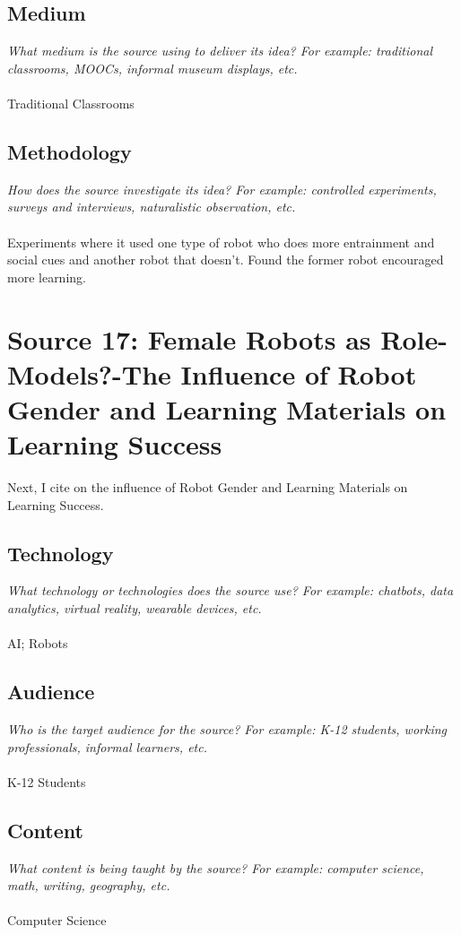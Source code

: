 \documentclass[12pt, final]{article}
\begin{document}
\subsection{Medium}
\textit{What medium is the source using to deliver its idea? For example: traditional classrooms, MOOCs, informal museum displays, etc.}
\\
\\
Traditional Classrooms

\subsection{Methodology}
\textit{How does the source investigate its idea? For example: controlled experiments, surveys and interviews, naturalistic observation, etc.}
\\
\\
Experiments where it used one type of robot who does more entrainment and social cues and another robot that doesn't. Found the former robot encouraged more learning.

\section{Source 17: Female Robots as Role-Models?-The Influence of Robot Gender and Learning Materials on Learning Success}
\label{Source 17}

Next, I cite \cite{Pfeifer} on the influence of Robot Gender and Learning Materials on Learning Success.

\subsection{Technology}
\textit{What technology or technologies does the source use? For example: chatbots, data analytics, virtual reality, wearable devices, etc.}
\\
\\
AI; Robots

\subsection{Audience}
\textit{Who is the target audience for the source? For example: K-12 students, working professionals, informal learners, etc.}
\\
\\
K-12 Students

\subsection{Content}
\textit{What content is being taught by the source? For example: computer science, math, writing, geography, etc.}
\\
\\
Computer Science
\end{document}
